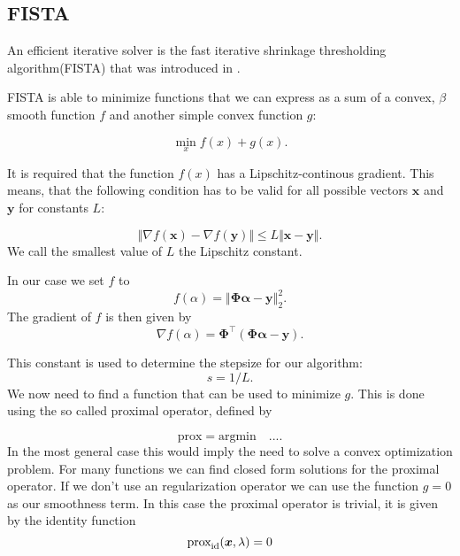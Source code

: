 
\subsection{FISTA}
An efficient iterative solver is the fast iterative shrinkage thresholding
algorithm(FISTA) that was introduced in \cite{fista}.

FISTA is able to minimize functions that we can express as a sum of a
convex, \(\beta\) smooth function \(f\) and another simple convex function
\(g\):  

\begin{equation}
\min_x f(x) + g(x). 
\end{equation}

It is required that the function \(f(x)\) has a Lipschitz-continous gradient. 
This means, that the following condition has to be valid for all possible
vectors \(\bm{x}\) and \(\bm{y}\) for constants \(L\):

\begin{equation}   \label{eq:lipschitz}
 \Vert \nabla f(\bm{x}) - \nabla f(\bm{y}) \Vert \leq L \Vert \bm{x} - \bm{y} \Vert.
\end{equation}
We call the smallest value of \(L\) the Lipschitz constant.

In our case we set \(f\) to
\begin{equation*}
 f(\alpha) = \left\Vert  \bm{\Phi} \bm{\alpha} - \bm{y}   \right\Vert_2^2.
\end{equation*}
The gradient of \(f\) is then given by
\begin{equation*}
  \nabla f(\alpha) = \bm{\Phi}^\intercal (\bm{\Phi} \bm{\alpha} - \bm{y}).
\end{equation*}

This constant is used to determine the stepsize for our algorithm:
\begin{equation*}
 s = 1/L. 
\end{equation*}
We now need to find a function that can be used to minimize \(g\).
This is done using the so called proximal operator, defined by

\begin{equation}
  \label{eq:proximal}
  \text{prox} = \text{argmin} \quad \text{...}.
\end{equation}
In the most general case this would imply the need to solve a convex
optimization problem.
For many functions we can find closed form solutions for the proximal operator.
If we don't use an regularization operator we can use the function \(g = 0\) as
our smoothness term.
In this case the proximal operator is trivial, it is given by the identity
function
\begin{equation*}
 \prox[id]{\bm{x}}{\lambda} = 0
\end{equation*}

